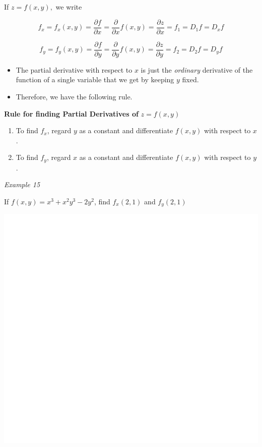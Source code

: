 \documentclass[]{book}
\begin{document}
If \(z=f(x,y),\) we write

\[f_x=f_x(x,y)= \frac{\partial f}{\partial x}= \frac{\partial }{\partial x}f(x,y)= \frac{\partial z }{\partial x}= f_1=D_1f= D_xf \]

\[f_y=f_y(x,y)= \frac{\partial f}{\partial y}= \frac{\partial }{\partial y}f(x,y)= \frac{\partial z }{\partial y}= f_2=D_2f= D_yf \]

\begin{itemize}
\item
  The partial derivative with respect to \(x\) is just the \emph{ordinary} derivative of the function of a single variable that we get by keeping \(y\) fixed.
\item
  Therefore, we have the following rule.
\end{itemize}

\textbf{Rule for finding Partial Derivatives of } \(z=f(x,y)\)

\begin{enumerate}
\def\labelenumi{\arabic{enumi}.}
\item
  To find \(f_x\), regard \(y\) as a constant and differentiate \(f(x,y)\) with respect to \(x\).
\item
  To find \(f_y\), regard \(x\) as a constant and differentiate \(f(x,y)\) with respect to \(y\).
\end{enumerate}

\emph{Example 15}

If \(f(x,y)=x^3+x^2y^3-2y^2\), find \(f_x(2,1)\) and \(f_y(2,1)\)

\begin{center}\includegraphics[width=1\linewidth]{figure/LB25b-1} \end{center}
\end{document}

